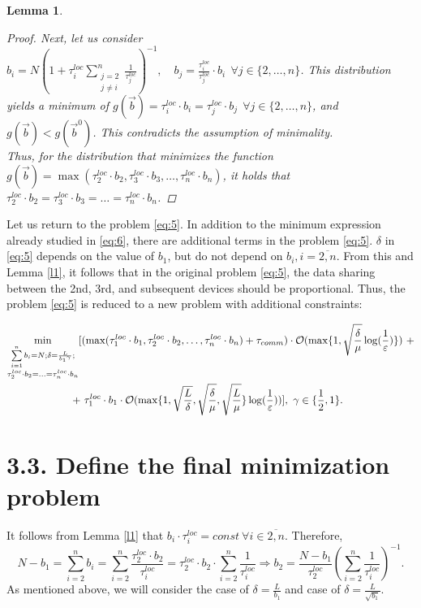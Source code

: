 \documentclass{article}
\theoremstyle{definition}
\theoremstyle{plain}
\newtheorem{lemma}[theorem]{Lemma}
\begin{document}
\begin{lemma}
\begin{proof}
        Next, let us consider $b_i = N(1 + \tau_i^{loc}\sum\limits_{\substack{j = 2 \\ j \neq i}}^n \frac{1}{\tau_j^{loc}})^{-1}, \quad b_j = \frac {\tau_i^{loc}}{\tau_j^{loc}}\cdot b_i  ~~ \forall j \in \{2,\ldots,n\}$. 
        This distribution yields a minimum of $g(\overrightarrow{b}) = \tau_i^{loc}\cdot b_i = \tau_j^{loc}\cdot b_j ~~ \forall j \in \{2,\ldots,n\}$, and $g(\overrightarrow{b}) < g(\overrightarrow{b}^0)$. 
        This contradicts the assumption of minimality. 
        \\
        Thus, for the distribution that minimizes the function $g(\overrightarrow{b}) = \max(\tau_2^{loc}\cdot b_2, \tau_3^{loc}\cdot b_3, \ldots, \tau_n^{loc}\cdot b_n)$, it holds that $\tau_2^{loc}\cdot b_2 = \tau_3^{loc}\cdot b_3 = \ldots = \tau_n^{loc}\cdot b_n$.
    \end{proof}
\end{lemma}
Let us return to the problem \eqref{eq:5}. In addition to the minimum expression already studied in \eqref{eq:6}, there are additional terms in the problem \eqref{eq:5}.  $\delta$ in \eqref{eq:5} depends on the value of $b_1$, but do not depend on $b_i, i = \overline{2, n}$. From this and Lemma \ref{l1}, it follows that in the original problem \eqref{eq:5}, the data sharing between the 2nd, 3rd, and subsequent devices should be proportional. Thus, the problem \eqref{eq:5} is reduced to a new problem with additional constraints:


\begin{eqnarray}
    \begin{split}
    \label{eq:7}
        \min_{\substack{\sum\limits_{i = 1}^{n} b_i = N; \delta = \frac{L}{{b_1}^\gamma};  \\
        \tau_2^{loc}\cdot b_2 = \ldots = \tau_n^{loc}\cdot b_n }} 
        [(\max(\tau_1^{loc}\cdot b_1, \tau_2^{loc}\cdot b_2, \ldots , \tau_n^{loc}\cdot b_n) + \tau_{comm})\cdot \mathcal O(\max\{1, \sqrt{\frac{\delta}{\mu}}\log(\frac{1}{\varepsilon})\}) ~+
        \\ + ~
        \tau_1^{loc}\cdot b_1\cdot\mathcal O(\max\{1,\sqrt{\frac{L}{\delta}}, \sqrt{\frac{\delta}{\mu}}, \sqrt{\frac{L}{\mu}}\}\log(\frac{1}{\varepsilon}))] ,  ~ \gamma \in \{\frac{1}{2}, 1\}. \hspace{2.4cm}
    \end{split}
\end{eqnarray}

    

\section*{3.3. Define the final minimization problem}
It follows from Lemma \ref{l1} that $b_i\cdot \tau_i^{loc} = const ~ \forall i \in \overline{2, n}$.
Therefore, $$ N - b_1 = \sum\limits_{i = 2}^{n} b_i = \sum\limits_{i = 2}^{n} \frac{\tau_2^{loc}\cdot b_2}{\tau_i^{loc}} = \tau_2^{loc}\cdot b_2 \cdot \sum\limits_{i = 2}^{n} \frac{1}{\tau_i^{loc}} \Rightarrow
b_2 = \frac{N - b_1}{\tau_2 ^{loc}}(\sum\limits_{i = 2}^{n} \frac{1}{\tau_i^{loc}})^{-1}.$$
As mentioned above, we will consider the case of $\delta = \frac{L}{b_1}$ and case of $\delta = \frac{L}{\sqrt{b_1}}$.
\end{document}
